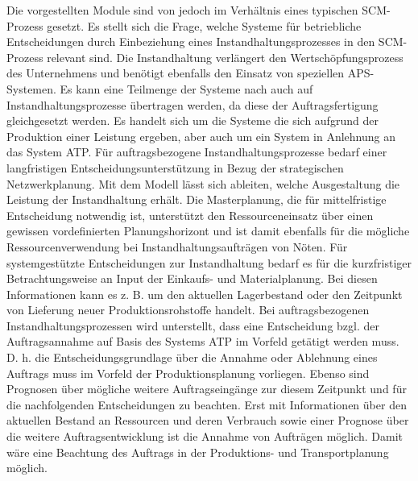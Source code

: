 Die vorgestellten Module sind von \cite{meyr2015structure} jedoch im Verhältnis eines typischen SCM-Prozess gesetzt. Es stellt sich die Frage, welche Systeme für betriebliche Entscheidungen durch Einbeziehung eines Instandhaltungsprozesses in den SCM-Prozess relevant sind. Die Instandhaltung verlängert den Wertschöpfungsprozess des Unternehmens und benötigt ebenfalls den Einsatz von speziellen APS-Systemen. Es kann eine Teilmenge der Systeme nach \cite{meyr2015structure} auch auf Instandhaltungsprozesse übertragen werden, da diese der Auftragsfertigung gleichgesetzt werden. Es handelt sich um die Systeme die sich aufgrund der Produktion einer Leistung ergeben, aber auch um ein System in Anlehnung an das System ATP. Für auftragsbezogene Instandhaltungsprozesse bedarf einer langfristigen Entscheidungsunterstützung in Bezug der strategischen Netzwerkplanung. Mit dem Modell lässt sich ableiten, welche Ausgestaltung die Leistung der Instandhaltung erhält. Die Masterplanung, die für mittelfristige Entscheidung notwendig ist, unterstützt den Ressourceneinsatz über einen gewissen vordefinierten Planungshorizont und ist damit ebenfalls für die mögliche Ressourcenverwendung bei Instandhaltungsaufträgen von Nöten. Für systemgestützte Entscheidungen zur Instandhaltung bedarf es für die kurzfristiger Betrachtungsweise an Input der Einkaufs- und Materialplanung. Bei diesen Informationen kann es z. B. um den aktuellen Lagerbestand oder den Zeitpunkt von Lieferung neuer Produktionsrohstoffe handelt. Bei auftragsbezogenen Instandhaltungsprozessen wird unterstellt, dass eine Entscheidung bzgl. der Auftragsannahme auf Basis des Systems ATP im Vorfeld getätigt werden muss. D. h. die Entscheidungsgrundlage über die Annahme oder Ablehnung eines Auftrags muss im Vorfeld der Produktionsplanung vorliegen. Ebenso sind Prognosen über mögliche weitere Auftragseingänge zur diesem Zeitpunkt und für die nachfolgenden Entscheidungen zu beachten. Erst mit Informationen über den aktuellen Bestand an Ressourcen und deren Verbrauch sowie einer Prognose über die weitere Auftragsentwicklung ist die Annahme von Aufträgen möglich. Damit wäre eine Beachtung des Auftrags in der Produktions- und Transportplanung möglich.

